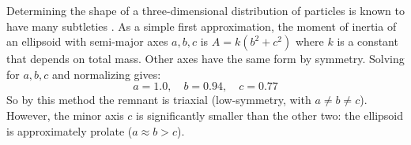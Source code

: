 \documentclass[twocolumn]{aastex63}
\newcommand{\todo}{\color{red}{TODO}\color{black}\hspace{2mm}}
\begin{document}
Determining the shape of a three-dimensional distribution of particles is known to have many subtleties \citep{maccio_concentration_2007, jing_triaxial_2002}. As a simple first approximation, the moment of inertia of an ellipsoid with semi-major axes $a, b, c$ is $A = k(b^2 + c^2)$ where $k$ is a constant that depends on total mass. Other axes have the same form by symmetry. Solving for $a, b, c$ and normalizing gives:
\[ a = 1.0,\quad b = 0.94,\quad c = 0.77 \]
So by this method the remnant is triaxial (low-symmetry, with $a \ne b \ne c$). However, the minor axis $c$ is significantly smaller than the other two: the ellipsoid is approximately prolate ($a \approx b > c$).

%
%
\end{document}
